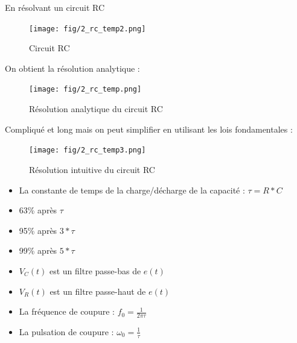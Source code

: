 \documentclass[a4paper]{article}
\begin{document}
            En résolvant un circuit RC
            \begin{figure}[H]
                \begin{center}
                    \texttt{[image: fig/2\_rc\_temp2.png]}
                    \caption{Circuit RC}
                    \label{fig:2_superposition}
                \end{center}
            \end{figure}
            On obtient la résolution analytique : 
            \begin{figure}[H]
                \begin{center}
                    \texttt{[image: fig/2\_rc\_temp.png]}
                    \caption{Résolution analytique du circuit RC}
                    \label{fig:2_superposition}
                \end{center}
            \end{figure}
            Compliqué et long mais on peut simplifier en utilisant les lois fondamentales :  
            \begin{figure}[H]
                \begin{center}
                    \texttt{[image: fig/2\_rc\_temp3.png]}
                    \caption{Résolution intuitive du circuit RC}
                    \label{fig:2_superposition}
                \end{center}
            \end{figure}
            \begin{itemize}
                \item La constante de temps de la charge/décharge de la capacité : $ \tau=R*C$
                \item 63\% après $ \tau $
                \item 95\% après $ 3*\tau $
                \item 99\% après $ 5*\tau $
                \item $ V_{C}(t) $ est un filtre passe-bas de $ e(t) $
                \item $ V_{R}(t) $ est un filtre passe-haut de $ e(t) $
                \item La fréquence de coupure : $ f_{0} = \frac{1}{2\pi\tau} $
                \item La pulsation de coupure : $ \omega_{0} = \frac{1}{\tau} $
            \end{itemize}
\end{document}
